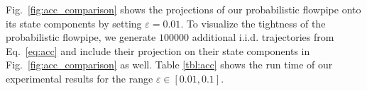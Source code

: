 Fig.~\ref{fig:acc_comparison} shows the projections of our probabilistic flowpipe onto its state components by setting $\varepsilon =0.01$. To visualize the tightness of the probabilistic flowpipe, we generate $100000$ additional i.i.d. trajectories from Eq.~\eqref{eq:acc} and include their projection on their state components in Fig.~\ref{fig:acc_comparison} as well. Table \ref{tbl:acc} shows the run time of our experimental results for the range $\varepsilon \in [0.01, 0.1]$.  
